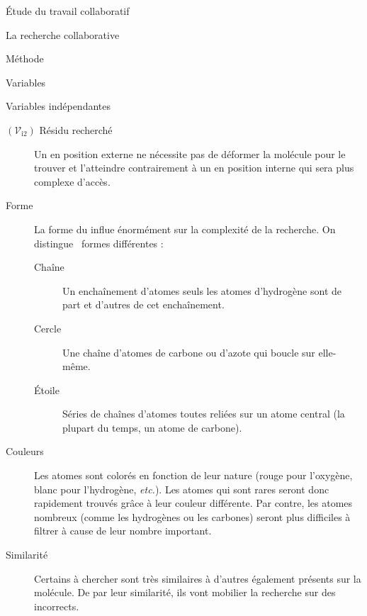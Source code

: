 \documentclass[myfrancais]{mythesis}
\newcommand{\mynum}[1]{\nombre{#1}}
\newcommand{\myvar}[2]{$\left(\mathcal{V}_{\mathrm{#1}#2}\right)$\xspace}
\newcommand{\myvari}[1]{\myvar{i}{#1}}
\newcommand{\myetc}{\textit{etc.}\xspace}
\begin{document}
\begin{mypart}{Étude du travail collaboratif}
\begin{mychapter}{La recherche collaborative}
\begin{mysection}{Méthode}
\begin{mysubsection}{Variables}
\begin{mysubsubsection}{Variables indépendantes}
\begin{myparagraph}{\myvari{2} Résidu recherché}
\begin{description}
									Un  en position externe ne nécessite pas de déformer la molécule pour le trouver et l'atteindre contrairement à un  en position interne qui sera plus complexe d'accès.
								\item[Forme] La forme du  influe énormément sur la complexité de la recherche.
									On distingue \mynum{3}~formes différentes :
									\begin{description}
										\item[Chaîne] Un enchaînement d'atomes seuls les atomes d'hydrogène sont de part et d'autres de cet enchaînement.
										\item[Cercle] Une chaîne d'atomes de carbone ou d'azote qui boucle sur elle-même.
										\item[Étoile] Séries de chaînes d'atomes toutes reliées sur un atome central (la plupart du temps, un atome de carbone).
									\end{description}
								\item[Couleurs] Les atomes sont colorés en fonction de leur nature (rouge pour l'oxygène, blanc pour l'hydrogène, \myetc).
									Les atomes qui sont rares seront donc rapidement trouvés grâce à leur couleur différente.
									Par contre, les atomes nombreux (comme les hydrogènes ou les carbones) seront plus difficiles à filtrer à cause de leur nombre important.
								\item[Similarité] Certains  à chercher sont très similaires à d'autres  également présents sur la molécule.
									De par leur similarité, ils vont mobilier la recherche sur des  incorrects.
							\end{description}


\end{myparagraph}
\end{mysubsubsection}
\end{mysubsection}
\end{mysection}
\end{mychapter}
\end{mypart}
\end{document}
